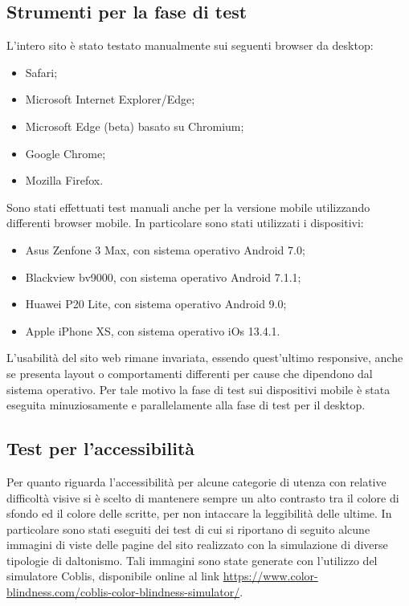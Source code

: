 \subsection{Strumenti per la fase di test}
L'intero sito è stato testato manualmente sui seguenti browser da desktop:
\begin{itemize}
	\item Safari;
	\item Microsoft Internet Explorer/Edge;
	\item Microsoft Edge (beta) basato su Chromium;
	\item Google Chrome;
	\item Mozilla Firefox.
\end{itemize}
Sono stati effettuati test manuali anche per la versione mobile utilizzando differenti browser mobile. In particolare sono stati utilizzati i dispositivi:
\begin{itemize}
	\item Asus Zenfone 3 Max, con sistema operativo Android 7.0;
	\item Blackview bv9000, con sistema operativo Android 7.1.1;
	\item Huawei P20 Lite, con sistema operativo Android 9.0;
	\item Apple iPhone XS, con sistema operativo iOs 13.4.1.
\end{itemize}
L’usabilità del sito web rimane invariata, essendo quest’ultimo responsive, anche se presenta layout o comportamenti differenti per cause che dipendono dal sistema operativo. Per tale motivo la fase di test sui dispositivi mobile è stata eseguita minuziosamente e parallelamente alla fase di test per il desktop.

\subsection{Test per l'accessibilità}
Per quanto riguarda l'accessibilità per alcune categorie di utenza con relative difficoltà visive si è scelto di mantenere sempre un alto contrasto tra il colore di sfondo ed il colore delle scritte, per non intaccare la leggibilità delle ultime.
In particolare sono stati eseguiti dei test di cui si riportano di seguito alcune immagini di viste delle pagine del sito realizzato con la simulazione di diverse tipologie di daltonismo. Tali immagini sono state generate con l'utilizzo del simulatore Coblis, disponibile online al link \url{https://www.color-blindness.com/coblis-color-blindness-simulator/}.

